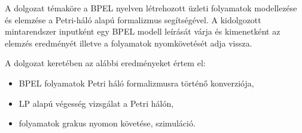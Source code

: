 
A dolgozat témaköre a BPEL nyelven létrehozott üzleti folyamatok modellezése  és elemzése a Petri-háló alapú formalizmus segítségével. A kidolgozott mintarendszer inputként egy BPEL modell leírását várja és kimenetként az elemzés eredményét illetve a folyamatok nyomkövetését adja vissza.

A dolgozat keretében az alábbi eredményeket értem el:
\begin{itemize}
\item BPEL folyamatok Petri háló formalizmusra történő konverziója,
\item LP alapú végesség vizsgálat a Petri hálón,
\item folyamatok grakus nyomon követése, szimuláció.
\end{itemize}


